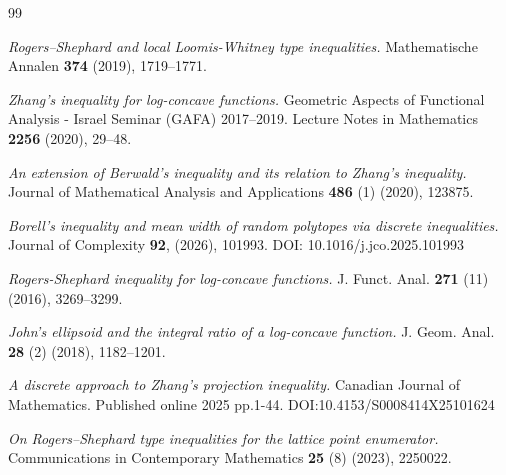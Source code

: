 \documentclass{amsart}
\theoremstyle{remark}
\theoremstyle{definition}
\numberwithin{equation}{section}
\begin{document}
\begin{thebibliography}{99}

\textit{Rogers--Shephard and local Loomis-Whitney type inequalities.}
 Mathematische Annalen {\bf 374} (2019), 1719--1771.


\textit{Zhang's inequality for log-concave functions.}
Geometric Aspects of Functional Analysis - Israel Seminar (GAFA) 2017--2019. Lecture Notes in Mathematics {\bf 2256} (2020), 29--48.

\textit{An extension of Berwald's inequality and its relation to Zhang's inequality.}
Journal of Mathematical Analysis and Applications {\bf 486} (1) (2020), 123875.



\textit{Borell's inequality and mean width of random polytopes via discrete inequalities.}
Journal of Complexity {\bf 92}, (2026), 101993. DOI: 10.1016/j.jco.2025.101993

\textit{Rogers-Shephard inequality for log-concave functions.}
 J. Funct. Anal. {\bf 271} (11) (2016), 3269--3299.

\textit{John's ellipsoid and the integral ratio of a log-concave function.}
J. Geom. Anal. {\bf 28} (2) (2018), 1182--1201.


\textit{A discrete approach to Zhang's projection inequality.}
Canadian Journal of Mathematics. Published online 2025 pp.1-44.
DOI:10.4153/S0008414X25101624

\textit{On Rogers--Shephard type inequalities for the lattice point enumerator.}
Communications in Contemporary Mathematics {\bf 25} (8) (2023), 2250022.




\end{thebibliography}
\end{document}
